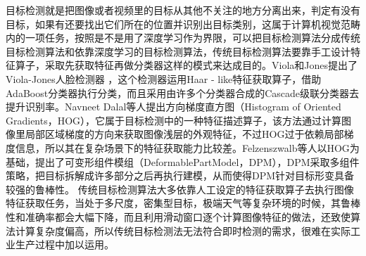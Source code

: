 目标检测就是把图像或者视频里的目标从其他不关注的地方分离出来，判定有没有目标，如果有还要找出它们所在的位置并识别出目标类别，这属于计算机视觉范畴内的一项任务，按照是不是用了深度学习作为界限，可以把目标检测算法分成传统目标检测算法和依靠深度学习的目标检测算法，传统目标检测算法要靠手工设计特征算子，采取先获取特征再做分类器这样的模式来达成目的。Viola和Jones提出了Viola-Jones人脸检测器 \cite{viola2001rapid}，这个检测器运用Haar - like特征获取算子，借助AdaBoost分类器执行分类，而且采用由许多个分类器合成的Cascade级联分类器去提升识别率。Navneet Dalal等人\cite{dalal2005histograms}提出方向梯度直方图（Histogram of Oriented Gradients，HOG），它属于目标检测中的一种特征描述算子，该方法通过计算图像里局部区域梯度的方向来获取图像浅层的外观特征，不过HOG过于依赖局部梯度信息，所以其在复杂场景下的特征获取能力比较差。Felzenszwalb等人\cite{felzenszwalb2009object}以HOG为基础，提出了可变形组件模组（DeformablePartModel，DPM），DPM采取多组件策略，把目标拆解成许多部分之后再执行建模，从而使得DPM针对目标形变具备较强的鲁棒性。 传统目标检测算法大多依靠人工设定的特征获取算子去执行图像特征获取任务，当处于多尺度，密集型目标，极端天气等复杂环境的时候，其鲁棒性和准确率都会大幅下降，而且利用滑动窗口逐个计算图像特征的做法，还致使算法计算复杂度偏高，所以传统目标检测法无法符合即时检测的需求，很难在实际工业生产过程中加以运用。

